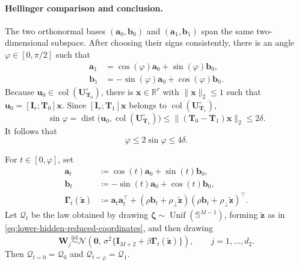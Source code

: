 \documentclass[11pt]{article}
\newcommand{\trans}{\top}
\begin{document}
\paragraph{Hellinger comparison and conclusion.}
The two orthonormal bases $(\bm a_0,\bm b_0)$ and
$(\bm a_1,\bm b_1)$ span the same two-dimensional subspace.  After choosing
their signs consistently, there is an angle $\varphi\in[0,\pi/2]$ such that
\begin{equation}
\begin{aligned}
  \bm a_1&=\cos(\varphi)\bm a_0+\sin(\varphi)\bm b_0,\\
  \bm b_1&=-\sin(\varphi)\bm a_0+\cos(\varphi)\bm b_0.
\end{aligned}
\label{eq:lower-hidden-endpoint-rotation}
\end{equation}
Because $\bm u_0\in\operatorname{col}(\bm U_{\bm T_0}^{\circ})$, there is
$\bm x\in\mathbb R^r$ with $\|\bm x\|_2\le1$ such that
$\bm u_0=[\bm I_r;\bm T_0]\bm x$.  Since
$[\bm I_r;\bm T_1]\bm x$ belongs to
$\operatorname{col}(\bm U_{\bm T_1}^{\circ})$,
\begin{equation}
  \sin\varphi
  =
  \operatorname{dist}\bigl(
    \bm u_0,\operatorname{col}(\bm U_{\bm T_1}^{\circ})
  \bigr)
  \le
  \|(\bm T_0-\bm T_1)\bm x\|_2
  \le
  2\delta.
\label{eq:lower-hidden-angle-sine}
\end{equation}
It follows that
\begin{equation}
  \varphi\le2\sin\varphi\le4\delta.
\label{eq:lower-hidden-angle-bound}
\end{equation}

For $t\in[0,\varphi]$, set
\begin{equation}
\begin{aligned}
  \bm a_t&\coloneqq\cos(t)\bm a_0+\sin(t)\bm b_0,\\
  \bm b_t&\coloneqq-\sin(t)\bm a_0+\cos(t)\bm b_0,\\
  \bm\Gamma_t(\widetilde{\bm z})
  &\coloneqq
  \bm a_t\bm a_t^\trans
  +
  (\rho\bm b_t+\rho_\perp\widetilde{\bm z})
  (\rho\bm b_t+\rho_\perp\widetilde{\bm z})^\trans.
\end{aligned}
\label{eq:lower-hidden-path-projector}
\end{equation}
Let $\mathcal Q_t$ be the law obtained by drawing
$\bm\zeta\sim\operatorname{Unif}(\mathbb S^{M-1})$, forming
$\widetilde{\bm z}$ as in \cref{eq:lower-hidden-reduced-coordinates}, and
then drawing
\begin{equation}
  \bm W_j
  \overset{\mathrm{iid}}{\sim}
  \mathcal N\left(
    \bm0,\,
    \sigma^2\{\bm I_{M+2}+\beta\bm\Gamma_t(\widetilde{\bm z})\}
  \right),
  \qquad
  j=1,\ldots,d_2.
\label{eq:lower-hidden-path-law}
\end{equation}
Then $\mathcal Q_{t=0}=\mathcal Q_0$ and
$\mathcal Q_{t=\varphi}=\mathcal Q_1$.
\end{document}
